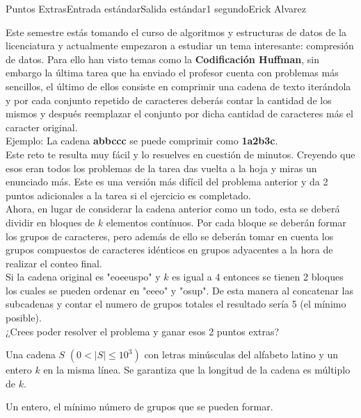\begin{problem}{Puntos Extras}{Entrada estándar}{Salida estándar}{1 segundo}{}{Erick Alvarez}

Este semestre estás tomando el curso de algoritmos y estructuras de datos de la licenciatura y actualmente empezaron a estudiar un tema interesante: compresión de datos. Para ello han visto temas como la \textbf{Codificación Huffman}, sin embargo la última tarea que ha enviado el profesor cuenta con problemas más sencillos, el último de ellos consiste en comprimir una cadena de texto iterándola y por cada conjunto repetido de caracteres deberás contar la cantidad de los mismos y después reemplazar el conjunto por dicha cantidad de caracteres más el caracter original.
\\

Ejemplo: La cadena  \textbf{abbccc} se puede comprimir como \textbf{1a2b3c}.\\

Este reto te resulta muy fácil y lo resuelves en cuestión de minutos. Creyendo que esos eran todos los problemas de la tarea das vuelta a la hoja y miras un enunciado más. Este es una versión más difícil del problema anterior y da 2 puntos adicionales a la tarea si el ejercicio es completado.\\

Ahora, en lugar de considerar la cadena anterior como un todo, esta se deberá dividir en bloques de $k$ elementos contínuos. Por cada bloque se deberán formar los grupos de caracteres, pero además de ello se deberán tomar en cuenta los grupos compuestos de caracteres idénticos en grupos adyacentes a la hora de realizar el conteo final.\\

Si la cadena original es "eoeeuspo" y $k$ es igual a 4 entonces se tienen 2 bloques los cuales se pueden ordenar en "eeeo" y "osup". De esta manera al concatenar las subcadenas y contar el numero de grupos totales el resultado sería 5 (el mínimo posible).\\

¿Crees poder resolver el problema y ganar esos 2 puntos extras?

\InputFile

Una cadena $S$ $(0 < |S| \leq 10^3)$ con letras minúsculas del alfabeto latino y un entero $k$ en la misma línea. Se garantiza que la longitud de la cadena es múltiplo de $k$.

\OutputFile

Un entero, el mínimo número de grupos que se pueden formar.

\Example
\begin{example}

\end{example}

\end{problem}

